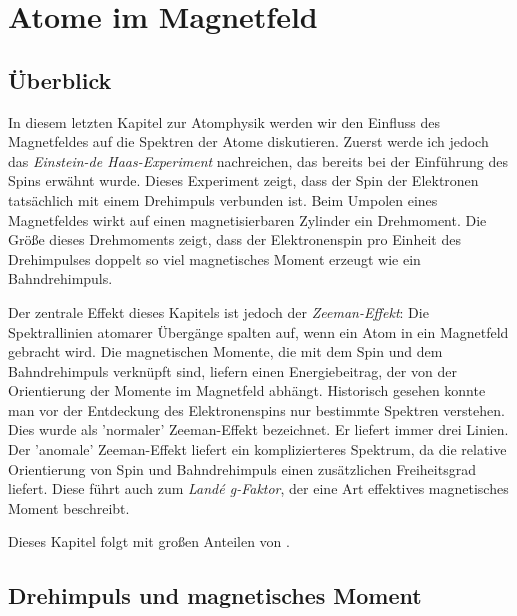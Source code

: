 \renewcommand{\lastmod}{9. Dezember 2025}
\renewcommand{\chapterauthors}{Markus Lippitz}

\chapter{Atome im Magnetfeld}






\section{Überblick}

In diesem letzten Kapitel zur Atomphysik werden wir den Einfluss des Magnetfeldes auf die Spektren der Atome diskutieren. Zuerst werde ich jedoch das \emph{Einstein-de Haas-Experiment} nachreichen, das bereits bei der Einführung des Spins erwähnt wurde. Dieses Experiment zeigt, dass der Spin der Elektronen tatsächlich mit einem Drehimpuls verbunden ist. Beim Umpolen eines Magnetfeldes wirkt auf einen magnetisierbaren Zylinder ein Drehmoment. Die Größe dieses Drehmoments zeigt, dass der Elektronenspin pro Einheit des Drehimpulses doppelt so viel magnetisches Moment erzeugt wie ein Bahndrehimpuls.

Der zentrale Effekt dieses Kapitels ist jedoch der \emph{Zeeman-Effekt}: Die Spektrallinien atomarer Übergänge spalten auf, wenn ein Atom in ein Magnetfeld gebracht wird. Die magnetischen Momente, die mit dem Spin und dem Bahndrehimpuls verknüpft sind, liefern einen Energiebeitrag, der von der Orientierung der Momente im Magnetfeld abhängt. Historisch gesehen konnte man vor der Entdeckung des Elektronenspins nur bestimmte Spektren verstehen. Dies wurde als 'normaler' Zeeman-Effekt bezeichnet. Er liefert immer drei Linien. Der 'anomale' Zeeman-Effekt liefert ein komplizierteres Spektrum, da die relative Orientierung von Spin und Bahndrehimpuls einen zusätzlichen Freiheitsgrad liefert. Diese führt auch zum \emph{Landé g-Faktor}, der eine Art effektives magnetisches Moment beschreibt.

Dieses Kapitel folgt \cite{Harris_moderne_Physik} mit großen Anteilen von \cite{Demtröder_ep3}.





\section{Drehimpuls und magnetisches Moment}

